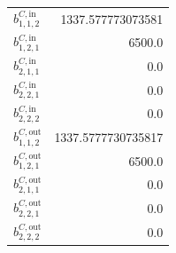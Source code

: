\documentclass{article}%
\begin{document}
\begin{multicols*}{3}
\begin{supertabular}{lr}
	$b_{1,1,2}^{C,\text{in}}$ & 1337.577773073581 \\%
	$b_{1,2,1}^{C,\text{in}}$ & 6500.0 \\%
	$b_{2,1,1}^{C,\text{in}}$ & 0.0 \\%
	$b_{2,2,1}^{C,\text{in}}$ & 0.0 \\%
	$b_{2,2,2}^{C,\text{in}}$ & 0.0 \\%
	$b_{1,1,2}^{C,\text{out}}$ & 1337.5777730735817 \\%
	$b_{1,2,1}^{C,\text{out}}$ & 6500.0 \\%
	$b_{2,1,1}^{C,\text{out}}$ & 0.0 \\%
	$b_{2,2,1}^{C,\text{out}}$ & 0.0 \\%
	$b_{2,2,2}^{C,\text{out}}$ & 0.0 \\%
\end{supertabular}%
\end{multicols*}%
\end{document}
